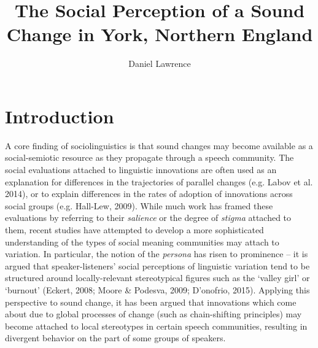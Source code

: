 \documentclass[PWPL]{article}
\title{The Social Perception of a Sound Change in York, Northern England}
\author{Daniel Lawrence}
\begin{document}
\maketitle

\section{Introduction}

A core finding of sociolinguistics is that sound changes may become available as a social-semiotic resource as they propagate through a speech community. The social evaluations attached to linguistic innovations are often used as an explanation for differences in the trajectories of parallel changes (e.g. Labov et al. 2014), or to explain differences in the rates of adoption of innovations across social groups (e.g. Hall-Lew, 2009). While much work has framed these evaluations by referring to their \textit{salience} or the degree of \textit{stigma} attached to them, recent studies have attempted to develop a more sophisticated understanding of the types of social meaning communities may attach to variation. In particular, the notion of the \textit{persona} has risen to prominence -- it is argued that speaker-listeners' social perceptions of linguistic variation tend to be structured around locally-relevant stereotypical figures such as the `valley girl' or `burnout' (Eckert, 2008; Moore \& Podesva, 2009; D'onofrio, 2015). Applying this perspective to sound change, it has been argued that innovations which come about due to global processes of change (such as chain-shifting principles) may become attached to local stereotypes in certain speech communities, resulting in divergent behavior on the part of some groups of speakers. 
\end{document}
